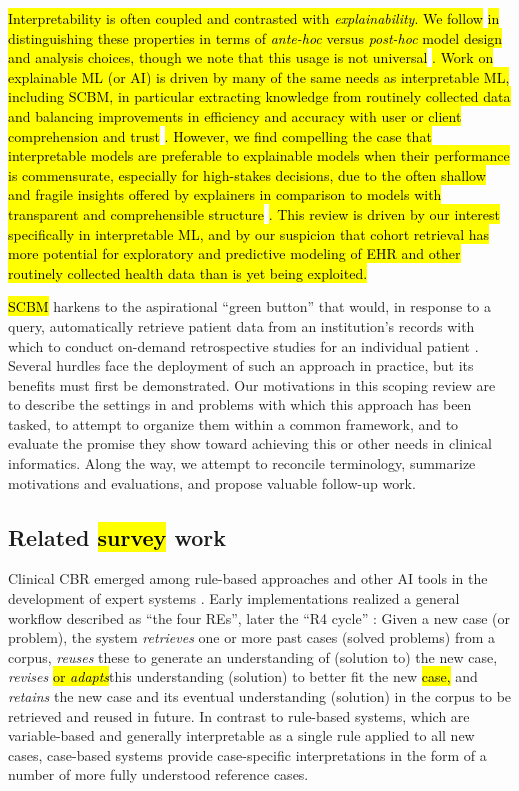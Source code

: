 \documentclass[sn-mathphys,Numbered,pdflatex]{sn-jnl}
\theoremstyle{remark}
\theoremstyle{definition}
\begin{document}
\hl{Interpretability is often coupled and contrasted with \emph{explainability}.
We follow }\citet{Lisboa2023}\hl{ in distinguishing these properties in terms of \emph{ante-hoc} versus \emph{post-hoc} model design and analysis choices, though we note that this usage is not universal }\citep{Molnar2023}\hl{. Work on explainable ML (or AI) is driven by many of the same needs as interpretable ML, including SCBM, in particular extracting knowledge from routinely collected data and balancing improvements in efficiency and accuracy with user or client comprehension and trust }\citep{Lisboa2023}\hl{.
However, we find compelling the case that interpretable models are preferable to explainable models when their performance is commensurate, especially for high-stakes decisions, due to the often shallow and fragile insights offered by explainers in comparison to models with transparent and comprehensible structure }\citep{Rudin2022}\hl{.
This review is driven by our interest specifically in interpretable ML, and by our suspicion that cohort retrieval has more potential for exploratory and predictive modeling of EHR and other routinely collected health data than is yet being exploited.}

\hl{SCBM} harkens to the aspirational ``green button'' that would, in
response to a query, automatically retrieve patient data from an
institution's records with which to conduct on-demand retrospective
studies for an individual patient \citep{Longhurst2014}. Several hurdles
face the deployment of such an approach in practice, but its benefits
must first be demonstrated. Our motivations in this scoping review are
to describe the settings in and problems with which this approach has
been tasked, to attempt to organize them within a common framework, and
to evaluate the promise they show toward achieving this or other needs
in clinical informatics. Along the way, we attempt to reconcile
terminology, summarize motivations and evaluations, and propose valuable
follow-up work.

\subsection{\texorpdfstring{Related
\hl{survey }work}{Related work}}\label{related-work}

Clinical CBR emerged among rule-based approaches and other AI tools in
the development of expert systems \citep{Aamodt1994}. Early
implementations realized a general workflow described as ``the four
REs'', later the ``R4 cycle'' \citep{Aamodt1994, Begum2011}: Given a new
case (or problem), the system \emph{retrieves} one or more past cases
(solved problems) from a corpus, \emph{reuses} these to generate an
understanding of (solution to) the new case, \emph{revises}
\hl{or \emph{adapts}}this understanding (solution) to better fit the new
\hl{case,} and \emph{retains} the new case and its eventual
understanding (solution) in the corpus to be retrieved and reused in
future. In contrast to rule-based systems, which are variable-based and
generally interpretable as a single rule applied to all new cases,
case-based systems provide case-specific interpretations in the form of
a number of more fully understood reference cases.
\end{document}
